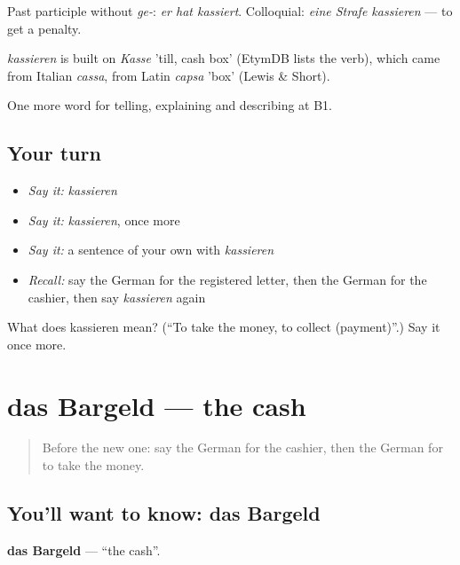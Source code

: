 Past participle without \emph{ge-}: \emph{er hat kassiert}. Colloquial: \emph{eine Strafe kassieren} — to get a penalty.

\begin{cousinweb}
\emph{kassieren} is built on \emph{Kasse} 'till, cash box' (EtymDB lists the verb), which came from Italian \emph{cassa}, from Latin \emph{capsa} 'box' (Lewis \& Short).
\end{cousinweb}

\begin{grammarlens}[title={What you've built}]
One more word for telling, explaining and describing at B1.
\end{grammarlens}

\subsection*{Your turn}
\begin{itemize}
\raggedright
  \item \emph{Say it:} \emph{kassieren}
  \item \emph{Say it:} \emph{kassieren}, once more
  \item \emph{Say it:} a sentence of your own with \emph{kassieren}
  \item \emph{Recall:} say the German for the registered letter, then the German for the cashier, then say \emph{kassieren} again
\end{itemize}

\begin{tcolorbox}[breakable,colback=teal!4,colframe=teal!35!black,title={Before you move on}]
What does kassieren mean? (\textquotedblleft{}To take the money, to collect (payment)\textquotedblright{}.) Say it once more.
\end{tcolorbox}
\section[das Bargeld]{das Bargeld — the cash}

\label{lesson:GE-C449-bargeld}



\begin{quote}
Before the new one: say the German for the cashier, then the German for to take the money.
\end{quote}

\subsection*{You'll want to know: das Bargeld}
\textbf{das Bargeld} — \textquotedblleft{}the cash\textquotedblright{}.

